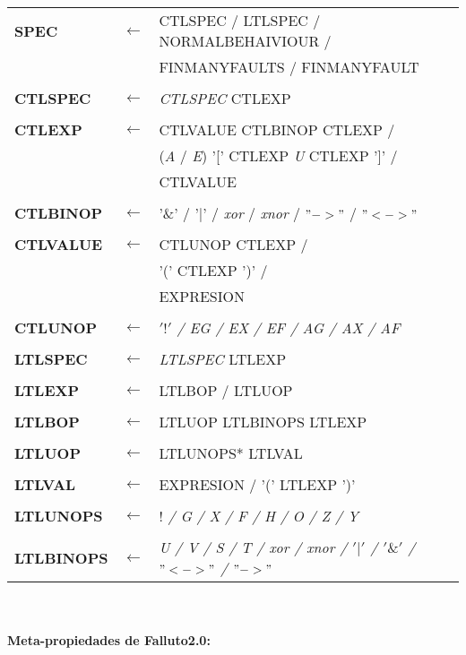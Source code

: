 \documentclass[titlepage, 12pt]{book}
\begin{document}
\noindent\begin{longtable}{>{\bfseries}lll}
SPEC 	  & $\longleftarrow$ & CTLSPEC / LTLSPEC / NORMALBEHAIVIOUR /\\
	 	  &	 			     & FINMANYFAULTS / FINMANYFAULT\\\\
CTLSPEC   & $\longleftarrow$ &\textit{CTLSPEC} CTLEXP\\\\
CTLEXP 	  & $\longleftarrow$ & CTLVALUE CTLBINOP CTLEXP /\\
          &                  & (\textit{A} / \textit{E}) '[' CTLEXP \textit{U} CTLEXP ']' /\\
          &                  & CTLVALUE\\\\
CTLBINOP  & $\longleftarrow$ & '\&' / '$|$' / \textit{xor} / \textit{xnor} / $"->"$ / $"<->"$\\\\
CTLVALUE  & $\longleftarrow$ & CTLUNOP CTLEXP /\\
          &                  & '(' CTLEXP ')' /\\
          &                  & EXPRESION\\\\
CTLUNOP   & $\longleftarrow$ & \textit{$'!'$ / EG / EX / EF / AG / AX / AF}\\\\
LTLSPEC   & $\longleftarrow$ & \textit{LTLSPEC} LTLEXP\\\\
LTLEXP    & $\longleftarrow$ & LTLBOP / LTLUOP\\\\
LTLBOP    & $\longleftarrow$ & LTLUOP LTLBINOPS LTLEXP\\\\
LTLUOP    & $\longleftarrow$ & LTLUNOPS* LTLVAL\\\\
LTLVAL    & $\longleftarrow$ & EXPRESION / '(' LTLEXP ')'\\\\
LTLUNOPS  & $\longleftarrow$ & \textit{$!$ / G / X / F / H / O / Z / Y}\\\\
LTLBINOPS & $\longleftarrow$ & \textit{ U / V / S / T / xor / xnor / $'|'$ / $'\&'$ / $"<->"$ / $"->"$}\\
\end{longtable}
~\\\\
\newpage
\textbf{Meta-propiedades de Falluto2.0:}\\
\end{document}
